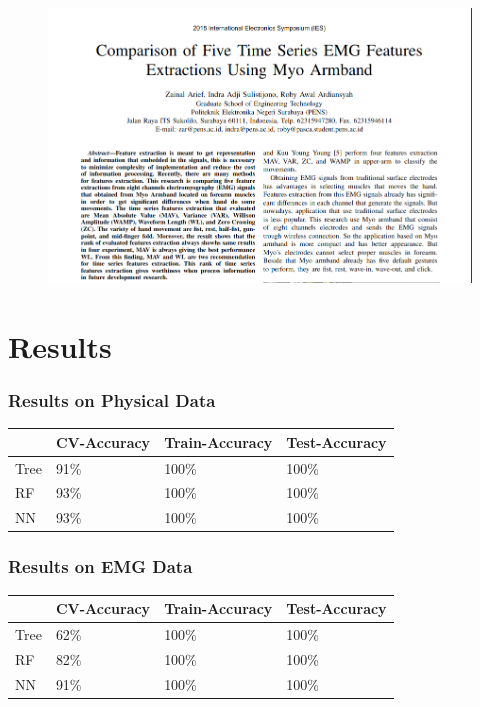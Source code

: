 \documentclass{beamer}
\begin{document}
\begin{frame}

\begin{figure}
	\includegraphics[scale=.35]{emg_fe}
\end{figure}

\end{frame}

\section{Results}

\begin{frame}
\frametitle{Results on Physical Data}


\begin{tabular}{ |p{2cm}|p{2cm}||p{2cm}|p{2cm}|  }
 \hline
 &CV-Accuracy & Train-Accuracy & Test-Accuracy \\
 \hline
 Tree & 91\% & 100\%  & 100\% \\
 \hline
 RF & 93\%    & 100\%   & 100\% \\
 \hline
 NN & 93\%   & 100\%  & 100\% \\
 \hline
\end{tabular}

\end{frame}

\begin{frame}
\frametitle{Results on EMG Data}

\begin{tabular}{ |p{2cm}|p{2cm}||p{2cm}|p{2cm}|  }
 \hline
 &CV-Accuracy & Train-Accuracy & Test-Accuracy \\
 \hline
 Tree & 62\% & 100\%  & 100\% \\
 \hline
 RF & 82\%    & 100\%   & 100\% \\
 \hline
 NN & 91\%   & 100\%  & 100\% \\
 \hline
\end{tabular}

\end{frame}
\end{document}
